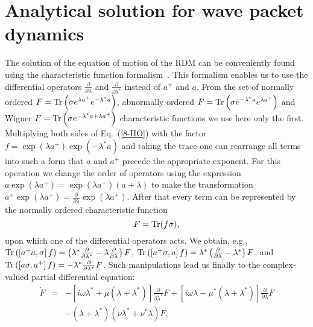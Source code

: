 \documentclass[12pt,twoside,a4paper]{report}
\begin{document}
\section{Analytical solution for wave packet dynamics} \label{quant-anal}
The solution of the equation
of motion of the RDM can be conveniently
found using the characteristic function 
formalism~\cite{kubo85,loui64,yuen76,puri77}. 
This formalism enables us
to use the differential operators
 $\frac{\partial}{\partial \lambda} $ and 
 $\frac{\partial}{\partial \lambda^*} $
instead of $ a^+ $ and $ a $.
From the set of normally ordered 
$F={\rm Tr}\left( \sigma e^{\lambda a^+} e^{-\lambda^*a} \right)$,
abnormally ordered
$F={\rm Tr}\left( \sigma e^{-\lambda^* a} e^{\lambda a^+} \right)$
and Wigner
$F={\rm Tr}\left( \sigma e^{-\lambda^* a + \lambda a^+} \right)$
characteristic functions \cite{yuen76} we use here only the first.
 Multiplying 
 both sides
of Eq.~(\ref{8-HO}) with  the factor 
$f=\exp{(\lambda a^+ )} \exp{(-\lambda^* a)} $
and taking the trace 
one can rearrange all terms into such a form that 
$a$ and $ a^+ $ precede the appropriate exponent.
For this operation we change the order of operators
using the expression
$ a \exp{(\lambda a^+)} = \exp{(\lambda a^+)} \left( a+\lambda  \right) $
to make the transformation
$ a^+ \exp{(\lambda a^+)}  = 
                    \frac{\partial}{\partial \lambda} \exp{(\lambda a^+)}$.
After that every term can be represented by the
normally ordered characteristic function
\begin{equation}
F={\rm Tr}(f \sigma),
\label{characteristic-function}
\end{equation}
upon which one of the differential operators acts.
We obtain, e.g.,
${\rm Tr} \left( 
            \left[ 
                  a^+ a, \sigma 
            \right] f 
          \right) 
   = \left( 
        \lambda^* \frac{\partial}{\partial \lambda^*}
      - \lambda   \frac{\partial}{\partial \lambda}
     \right) F  $,
${\rm Tr} \left( 
            \left[ 
                  a^+ \sigma, a 
            \right] f 
          \right) 
   = \lambda^*
     \left( 
        \frac{\partial}{\partial \lambda}
      - \lambda^*
     \right) F  $, and
${\rm Tr} \left( 
            \left[ 
                  a \sigma, a^+ 
            \right] f 
          \right) 
   =  - \lambda^* \frac{\partial}{\partial \lambda^*} F  $.
Such manipulations lead us finally to the  
complex-valued partial differential equation:
\begin{eqnarray}
  \dot{F} 
      &=& -  \left[ 
                  {{i}}\omega \lambda ^{*}
                  + \mu
                  \left( 
                     \lambda +\lambda ^{*}
                  \right) 
             \right] 
             \frac{\partial}{\partial \lambda^{*}}
             F \nonumber
         +   \left[ 
                 {{i}}\omega \lambda 
                 -\mu^{*}
                  \left( 
                    \lambda+\lambda ^{*}
                  \right) 
              \right] 
              \frac{\partial}{\partial \lambda} F \nonumber \\ 
&&       -    \left( \lambda +\lambda ^{*}\right) 
              \left( 
                  \nu \lambda^{*}+\nu^{*}\lambda 
              \right) F, \label{14-HO}
\end{eqnarray}
\end{document}
